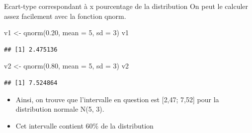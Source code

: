 \documentclass[
  ignorenonframetext,
]{beamer}
\newenvironment{Shaded}{\begin{snugshade}}{\end{snugshade}}
\newcommand{\AttributeTok}[1]{\textcolor[rgb]{0.77,0.63,0.00}{#1}}
\newcommand{\DecValTok}[1]{\textcolor[rgb]{0.00,0.00,0.81}{#1}}
\newcommand{\FloatTok}[1]{\textcolor[rgb]{0.00,0.00,0.81}{#1}}
\newcommand{\FunctionTok}[1]{\textcolor[rgb]{0.00,0.00,0.00}{#1}}
\newcommand{\NormalTok}[1]{#1}
\newcommand{\OtherTok}[1]{\textcolor[rgb]{0.56,0.35,0.01}{#1}}
\providecommand{\tightlist}{%
  \setlength{\itemsep}{0pt}\setlength{\parskip}{0pt}}
\begin{document}
\begin{frame}[fragile]{Ecart-type correspondant à x pourcentage de la
distribution}
\protect\hypertarget{ecart-type-correspondant-uxe0-x-pourcentage-de-la-distribution-1}{}
On peut le calculer assez facilement avec la fonction qnorm.

\begin{Shaded}
\begin{Highlighting}[]
\NormalTok{v1 }\OtherTok{\textless{}{-}} \FunctionTok{qnorm}\NormalTok{(}\FloatTok{0.20}\NormalTok{, }\AttributeTok{mean =} \DecValTok{5}\NormalTok{, }\AttributeTok{sd =} \DecValTok{3}\NormalTok{)}
\NormalTok{v1}
\end{Highlighting}
\end{Shaded}

\begin{verbatim}
## [1] 2.475136
\end{verbatim}

\begin{Shaded}
\begin{Highlighting}[]
\NormalTok{v2 }\OtherTok{\textless{}{-}} \FunctionTok{qnorm}\NormalTok{(}\FloatTok{0.80}\NormalTok{, }\AttributeTok{mean =} \DecValTok{5}\NormalTok{, }\AttributeTok{sd =} \DecValTok{3}\NormalTok{)}
\NormalTok{v2}
\end{Highlighting}
\end{Shaded}

\begin{verbatim}
## [1] 7.524864
\end{verbatim}

\begin{itemize}[<+->]
\tightlist
\item
  Ainsi, on trouve que l'intervalle en question est {[}2,47; 7,52{]}
  pour la distribution normale N(5, 3).
\end{itemize}

\begin{itemize}[<+->]
\tightlist
\item
  Cet intervalle contient 60\% de la distribution
\end{itemize}
\end{frame}
\end{document}
